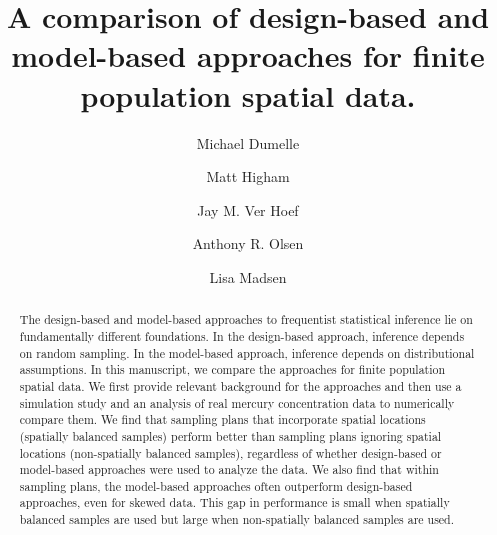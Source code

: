 \documentclass[]{elsarticle} %
\begin{document}
\begin{frontmatter}

  \title{A comparison of design-based and model-based approaches for finite
population spatial data.}
    \author[USEPA]{Michael Dumelle}
  
    \author[STLAW]{Matt Higham}
  
    \author[NOAA]{Jay M. Ver Hoef}
  
    \author[USEPA]{Anthony R. Olsen}
  
    \author[OSU]{Lisa Madsen}
  
      \address[USEPA]{United States Environmental Protection Agency, 200 SW 35th St,
Corvallis, Oregon, 97333}
    \address[STLAW]{Saint Lawrence University Department of Mathematics, Computer Science,
and Statistics, 23 Romoda Drive, Canton, New York, 13617}
    \address[NOAA]{Marine Mammal Laboratory, Alaska Fisheries Science Center, National
Oceanic and Atmospheric Administration, Seattle, Washington, 98115}
    \address[OSU]{Oregon State University Department of Statistics, 239 Weniger Hall,
Corvallis, Oregon, 97331}
  
  \begin{abstract}
  The design-based and model-based approaches to frequentist statistical
  inference lie on fundamentally different foundations. In the
  design-based approach, inference depends on random sampling. In the
  model-based approach, inference depends on distributional assumptions.
  In this manuscript, we compare the approaches for finite population
  spatial data. We first provide relevant background for the approaches
  and then use a simulation study and an analysis of real mercury
  concentration data to numerically compare them. We find that sampling
  plans that incorporate spatial locations (spatially balanced samples)
  perform better than sampling plans ignoring spatial locations
  (non-spatially balanced samples), regardless of whether design-based or
  model-based approaches were used to analyze the data. We also find that
  within sampling plans, the model-based approaches often outperform
  design-based approaches, even for skewed data. This gap in performance
  is small when spatially balanced samples are used but large when
  non-spatially balanced samples are used.
  \end{abstract}
  
 \end{frontmatter}
\end{document}

